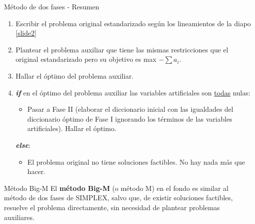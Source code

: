 \documentclass[10pt, aspectratio=169]{beamer}
\begin{document}
    \begin{frame}{Método de dos fases - Resumen}

        \begin{enumerate}
            \item Escribir el problema original estandarizado según los lineamientos de la diapo \ref{slide2}
            \item Plantear el problema auxiliar que tiene las mismas restricciones que el original estandarizado pero su
            objetivo es max $-\sum a_i$.
            \item Hallar el óptimo del problema auxiliar.
            \item \textbf{\textit{if}} en el óptimo del problema auxiliar las variables artificiales son
            \underline{todas} nulas:
            \begin{itemize}
                \item
                Pasar a Fase II (elaborar el diccionario inicial con las igualdades del diccionario óptimo de Fase I
                ignorando los términos de las variables artificiales). Hallar el óptimo.
            \end{itemize}
            \textbf{\textit{else}}:
            \begin{itemize}
                \item El problema original no tiene soluciones factibles. No hay nada más que hacer.
            \end{itemize}
        \end{enumerate}
    \end{frame}

    \begin{frame}{Método Big-M}
        El \textbf{método Big-M} (o método M)
        en el fondo es similar al método de dos fases de SIMPLEX, salvo que, de existir soluciones factibles, resuelve
        el problema directamente, sin necesidad de plantear problemas auxiliares.\\
        \vskip 0.3cm
    \end{frame}
\end{document}
